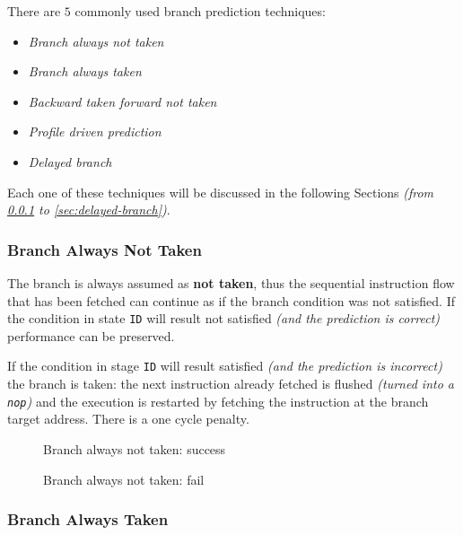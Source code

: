 \documentclass[english]{article}
\begin{document}
There are \(5\) commonly used branch prediction techniques:

\begin{itemize}
  \item \textit{Branch always not taken}
  \item \textit{Branch always taken}
  \item \textit{Backward taken forward not taken}
  \item \textit{Profile driven prediction}
  \item \textit{Delayed branch}
\end{itemize}

Each one of these techniques will be discussed in the following Sections \textit{(from \ref{sec:branch-always-not-taken} to \ref{sec:delayed-branch})}.

\subsubsection{Branch Always Not Taken}
\label{sec:branch-always-not-taken}

The branch is always assumed as \textbf{not taken}, thus the sequential instruction flow that has been fetched can continue as if the branch condition was not satisfied.
If the condition in state \texttt{ID} will result not satisfied \textit{(and the prediction is correct)} performance can be preserved.

If the condition in stage \texttt{ID} will result satisfied \textit{(and the prediction is incorrect)} the branch is taken: the next instruction already fetched is flushed \textit{(turned into a \texttt{nop})} and the execution is restarted by fetching the instruction at the branch target address.
There is a one cycle penalty.

\begin{figure}[htbp]
  \bigskip
  \centering
  \caption{Branch always not taken: success}
  \label{fig:branch-always-not-taken}
  \bigskip
\end{figure}

\begin{figure}[htbp]
  \bigskip
  \centering
  \caption{Branch always not taken: fail}
  \label{fig:branch-always-not-taken-fail}
  \bigskip
\end{figure}

\subsubsection{Branch Always Taken}
\label{sec:branch-always-taken}
\end{document}
